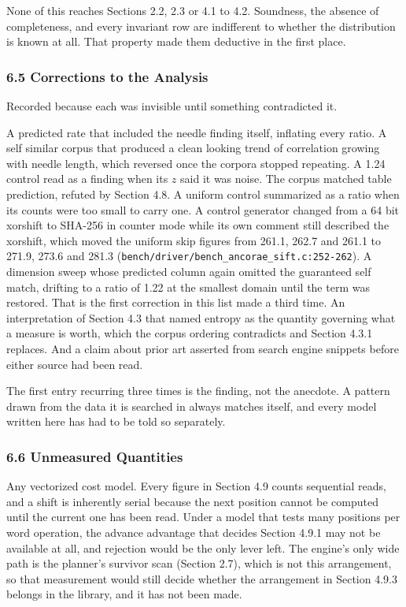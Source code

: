 None of this reaches Sections 2.2, 2.3 or 4.1 to 4.2. Soundness, the absence of completeness, and every invariant row are indifferent to whether the distribution is known at all. That property made them deductive in the first place.

\subsubsection{6.5 Corrections to the Analysis}

Recorded because each was invisible until something contradicted it.

A predicted rate that included the needle finding itself, inflating every ratio. A self similar corpus that produced a clean looking trend of correlation growing with needle length, which reversed once the corpora stopped repeating. A 1.24 control read as a finding when its \(z\) said it was noise. The corpus matched table prediction, refuted by Section 4.8. A uniform control summarized as a ratio when its counts were too small to carry one. A control generator changed from a 64 bit xorshift to SHA-256 in counter mode while its own comment still described the xorshift, which moved the uniform skip figures from 261.1, 262.7 and 261.1 to 271.9, 273.6 and 281.3 (\texttt{bench/\allowbreak{}driver/\allowbreak{}bench\_\allowbreak{}ancorae\_\allowbreak{}sift.\allowbreak{}c:252-\allowbreak{}262}). A dimension sweep whose predicted column again omitted the guaranteed self match, drifting to a ratio of 1.22 at the smallest domain until the term was restored. That is the first correction in this list made a third time. An interpretation of Section 4.3 that named entropy as the quantity governing what a measure is worth, which the corpus ordering contradicts and Section 4.3.1 replaces. And a claim about prior art asserted from search engine snippets before either source had been read.

The first entry recurring three times is the finding, not the anecdote. A pattern drawn from the data it is searched in always matches itself, and every model written here has had to be told so separately.

\subsubsection{6.6 Unmeasured Quantities}

Any vectorized cost model. Every figure in Section 4.9 counts sequential reads, and a shift is inherently serial because the next position cannot be computed until the current one has been read. Under a model that tests many positions per word operation, the advance advantage that decides Section 4.9.1 may not be available at all, and rejection would be the only lever left. The engine's only wide path is the planner's survivor scan (Section 2.7), which is not this arrangement, so that measurement would still decide whether the arrangement in Section 4.9.3 belongs in the library, and it has not been made.

